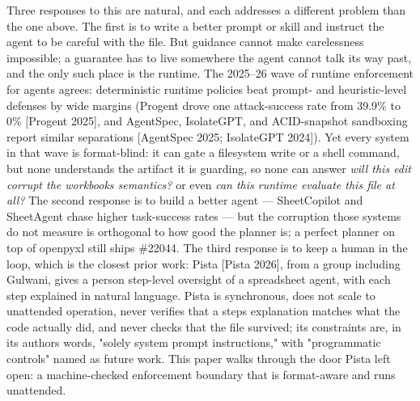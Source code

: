 \documentclass[
]{article}
\newcounter{none} %
\begin{document}
Three responses to this are natural, and each addresses a different
problem than the one above. The first is to write a better prompt or
skill and instruct the agent to be careful with the file. But guidance
cannot make carelessness impossible; a guarantee has to live somewhere
the agent cannot talk its way past, and the only such place is the
runtime. The 2025--26 wave of runtime enforcement for agents agrees:
deterministic runtime policies beat prompt- and heuristic-level defenses
by wide margins (Progent drove one attack-success rate from 39.9\% to
0\% {[}Progent 2025{]}, and AgentSpec, IsolateGPT, and ACID-snapshot
sandboxing report similar separations {[}AgentSpec 2025; IsolateGPT
2024{]}). Yet every system in that wave is format-blind: it can gate a
filesystem write or a shell command, but none understands the artifact
it is guarding, so none can answer \emph{will this edit corrupt the
workbook\textquotesingle s semantics?} or even \emph{can this runtime
evaluate this file at all?} The second response is to build a better
agent --- SheetCopilot and SheetAgent chase higher task-success rates
--- but the corruption those systems do not measure is orthogonal to how
good the planner is; a perfect planner on top of openpyxl still ships
\#22044. The third response is to keep a human in the loop, which is the
closest prior work: Pista {[}Pista 2026{]}, from a group including
Gulwani, gives a person step-level oversight of a spreadsheet agent,
with each step explained in natural language. Pista is synchronous, does
not scale to unattended operation, never verifies that a
step\textquotesingle s explanation matches what the code actually did,
and never checks that the file survived; its constraints are, in its
authors\textquotesingle{} words, "solely system prompt instructions,"
with "programmatic controls" named as future work. This paper walks
through the door Pista left open: a machine-checked enforcement boundary
that is format-aware and runs unattended.
\end{document}

